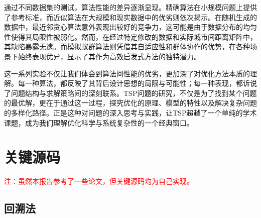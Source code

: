 通过不同数据集的测试，算法性能的差异逐渐显现。精确算法在小规模问题上提供了参考标准，而近似算法在大规模和现实数据中的优劣则依次揭示。在随机生成的数据中，最近邻贪心算法意外表现出较好的竞争力，这可能是由于数据分布的均匀性使得其局限性被弱化。然而，在经过特定修改的数据和实际城市间距离矩阵中，其缺陷暴露无遗。而模拟蚁群算法则凭借其自适应性和群体协作的优势，在各种场景下始终表现优异，显示了其作为高效启发式方法的独特潜力。

这一系列实验不仅让我们体会到算法间性能的优劣，更加深了对优化方法本质的理解。每一种算法，都反映了其背后设计思想的局限与可能性；每一种表现，都诉说了问题结构与求解策略间的深刻联系。TSP问题的研究，不仅是为了找到某个问题的最优解，更在于通过这一过程，探究优化的原理、模型的特性以及解决复杂问题的多样化路径。正是这种对问题的深入思考与实践，让TSP超越了一个单纯的学术课题，成为我们理解优化科学与系统复杂性的一个经典窗口。

\newpage

\printbibliography

\newpage

\appendix

\section{关键源码}

\textcolor{red}{注：虽然本报告参考了一些论文，但关键源码均为自己实现。}

\subsection{回溯法}

